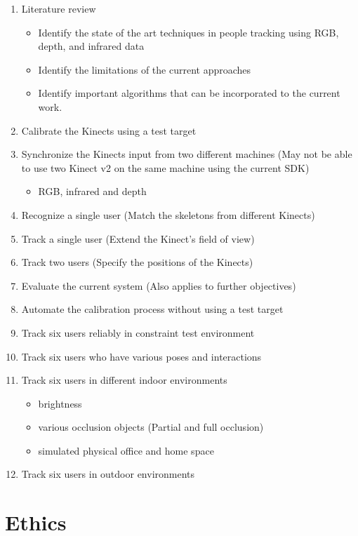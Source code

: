 \documentclass[paper=a4, fontsize=11pt]{scrartcl}
\numberwithin{equation}{section}
\numberwithin{figure}{section}
\numberwithin{table}{section}
\begin{document}
\begin{enumerate}
\item Literature review
	\begin{itemize}
		\item Identify the state of the art techniques in people tracking using RGB, depth, and infrared data
		\item Identify the limitations of the current approaches
		\item Identify important algorithms that can be incorporated to the current work.
	\end{itemize}
\item Calibrate the Kinects using a test target
\item Synchronize the Kinects input from two different machines (May not be able to use two Kinect v2 on the same machine using the current SDK)
	\begin{itemize}
		\item RGB, infrared and depth
	\end{itemize}
\item Recognize a single user (Match the skeletons from different Kinects)
\item Track a single user (Extend the Kinect's field of view)
\item Track two users (Specify the positions of the Kinects)
\item Evaluate the current system (Also applies to further objectives)
\item Automate the calibration process without using a test target
\item Track six users reliably in constraint test environment
\item Track six users who have various poses and interactions
\item Track six users in different indoor environments
	\begin{itemize}
		\item brightness
		\item various occlusion objects (Partial and full occlusion)
		\item simulated physical office and home space
	\end{itemize}
\item Track six users in outdoor environments
\end{enumerate}

\section{Ethics}
\end{document}
